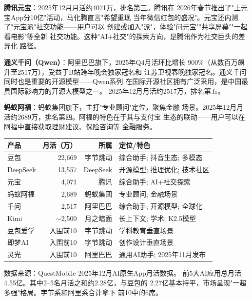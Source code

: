 \textbf{腾讯元宝}：2025年12月月活约4071万，排名第三。腾讯在
2026年春节推出了"上元宝App分10亿"活动，马化腾直言"希望重现
当年微信红包的盛况"。元宝还内测了"元宝派"社交功能——用户可以
创建或加入"派"，体验"问元宝""共享屏幕""一起看电影"等全新
社交功能。这种"AI+社交"的探索方向，是腾讯作为社交巨头的差异化
路径。

\textbf{通义千问（Qwen）}：阿里巴巴旗下，2025年Q4月活环比增长
900\%（从数百万飙升至2517万），受益于B站跨年晚会独家冠名和
江苏卫视春晚独家冠名。通义千问同时也是重要的开源模型——Qwen系列
在国际开源社区拥有广泛采用，是中国最具国际影响力的开源大模型之一。
2025年12月月活约2517万，排名第五。

\textbf{蚂蚁阿福}：蚂蚁集团旗下，主打"专业顾问"定位，聚焦金融
场景。2025年12月月活约2689万，排名第四。阿福的特色在于其与支付宝
生态的联动——用户可以在阿福中直接获取理财建议、保险咨询等
金融服务。

\begin{keybox}
\small
\begin{tabularx}{\textwidth}{l r r X}
\toprule
\rowcolor{figLightGray}
\textbf{产品} & \textbf{月活（万）} & \textbf{所属} & \textbf{定位/特色} \\
\midrule
豆包       & 22,669 & 字节跳动 & 综合助手; 抖音生态; 多模态 \\
DeepSeek   & 13,557 & DeepSeek & 开源模型; 推理优化; 技术社区 \\
元宝       & 4,071  & 腾讯     & 综合助手; AI+社交探索 \\
蚂蚁阿福   & 2,689  & 蚂蚁集团 & 专业顾问; 金融场景 \\
千问       & 2,517  & 阿里巴巴 & 综合助手; 开源模型; 全球化 \\
Kimi       & $\sim$2,500 & 月之暗面 & 长上下文; 学术; K2.5模型 \\
豆包爱学   & 入围前10 & 字节跳动 & 学科教育垂直场景 \\
即梦AI     & 入围前10 & 字节跳动 & 创作设计垂直场景 \\
灵光       & 入围前10 & 阿里巴巴 & 通用AI助手; 2025年11月发布 \\
\bottomrule
\end{tabularx}

\medskip
\noindent 数据来源：QuestMobile 2025年12月AI原生App月活数据。
前5大AI应用总月活4.55亿。其中2--5名月活之和约2.28亿，与豆包的
2.27亿基本持平，市场呈现"一超多强"格局。字节系和阿里系合计拿下
前10中的6席。
\end{keybox}

